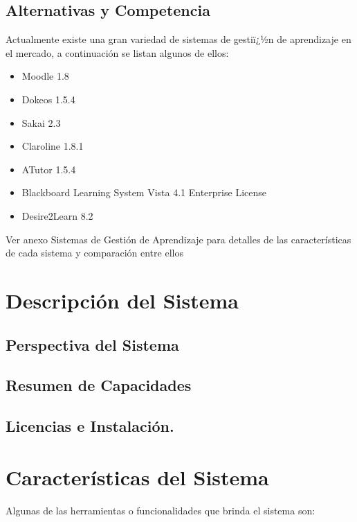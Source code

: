 \documentclass{article}
\begin{document}
	\subsection{Alternativas y Competencia}
	Actualmente existe una gran variedad de sistemas de gestiï¿½n de aprendizaje en el mercado, a continuación se listan algunos de ellos:
	\begin{itemize}
	\item Moodle 1.8
	\item Dokeos 1.5.4
	\item Sakai 2.3
	\item Claroline 1.8.1
	\item ATutor 1.5.4
	\item Blackboard Learning System Vista 4.1 Enterprise License
	\item Desire2Learn 8.2
	\end{itemize}

	Ver anexo Sistemas de Gestión de Aprendizaje para detalles de las características de cada sistema y comparación entre ellos 

\section{Descripción del Sistema}

\subsection{Perspectiva del Sistema}

\subsection{Resumen de Capacidades}

\subsection{Licencias e Instalación.}

\section{Características del Sistema}

Algunas de las herramientas o funcionalidades que brinda el sistema son:
\end{document}
